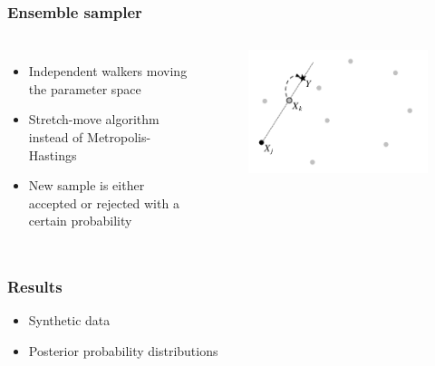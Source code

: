 \documentclass{beamer}
\begin{document}
\begin{frame}
\frametitle{Ensemble sampler}
\begin{columns}[t] %
\begin{itemize}

\item Independent walkers moving the parameter space
\item Stretch-move algorithm instead of Metropolis-Hastings 
\item New sample is either accepted or rejected with a certain probability

\end{itemize}
\begin{figure}
\includegraphics[width=0.8\linewidth]{stretchmove.png}
\end{figure}
\end{columns}
\end{frame}



\begin{frame}
\frametitle{Results}
\begin{itemize}
\item Synthetic data
\item Posterior probability distributions
\end{itemize}
\end{frame}
\end{document}
